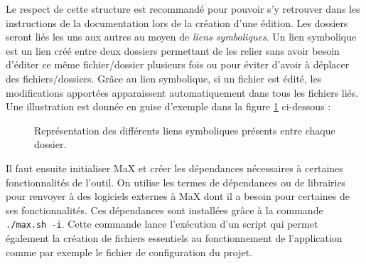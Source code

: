 \documentclass[a4paper,12pt,twoside]{book}
\begin{document}
Le respect de cette structure est recommandé pour pouvoir s'y retrouver dans les instructions de la documentation lors de la création d'une édition. Les dossiers seront liés les uns aux autres au moyen de \textit{liens symboliques}. Un lien symbolique est un lien créé entre deux dossiers permettant de les relier sans avoir besoin d'éditer ce même fichier/dossier plusieurs fois ou pour éviter d'avoir à déplacer des fichiers/dossiers.  Grâce au lien symbolique, si un fichier est édité, les modifications apportées apparaissent automatiquement dans tous les fichiers liés. Une illustration est donnée en guise d'exemple dans la figure \ref{lien} ci-dessous :

\begin{figure}[H]
    \centering
    \caption[Représentation des différents liens symboliques présents entre chaque dossier]{Représentation des différents liens symboliques présents entre chaque dossier.\footnotemark}
    \label{lien}
\end{figure}



Il faut ensuite initialiser MaX et créer les dépendances nécessaires à certaines fonctionnalités de l'outil. On utilise les termes de \og dépendances\fg{} ou de \og librairies\fg{} pour renvoyer à des logiciels externes à MaX dont il a besoin pour certaines de ses fonctionnalités. Ces dépendances sont installées grâce à la commande \texttt{./max.sh -i}. Cette commande lance l'exécution d'un script qui permet également la création de fichiers essentiels au fonctionnement de l'application comme par exemple le fichier de configuration du projet.
\end{document}
